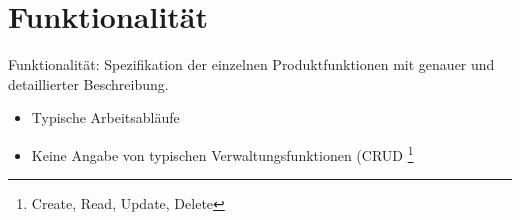 \chapter{Funktionalität}
Funktionalität: Spezifikation der einzelnen Produktfunktionen mit genauer und
detaillierter Beschreibung.
 
\begin{itemize}
  \item Typische Arbeitsabläufe
  \item Keine Angabe von typischen Verwaltungsfunktionen (CRUD \footnote{Create,
Read, Update, Delete}
\end{itemize}
